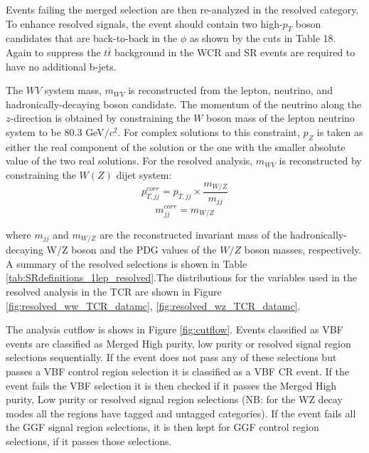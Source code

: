 Events failing the merged selection are then re-analyzed in the resolved category. To enhance resolved signals, the event should contain two high-$p_{T}$ boson candidates that are back-to-back in the $\phi$ as shown by the cuts in Table 18. Again to suppress the $t\bar{t}$ background in the WCR and SR events are required to have no additional b-jets. 

The $WV$ system mass, $m_{WV}$ is reconstructed from the lepton, neutrino, and hadronically-decaying boson candidate. The momentum of the neutrino along the $z$-direction is obtained by constraining the $W$ boson mass of the lepton neutrino system to be  80.3 GeV$/c^{2}$. For complex solutions to this constraint, $p_{Z}$ is taken as either the real component of the solution or the one with the smaller absolute value of the two real solutions. For the resolved analysis, $m_{WV}$ is reconstructed by constraining the $W(Z)$ dijet system:
\begin{equation}
p^{corr}_{T,jj} = p_{T,jj} \times \frac{m_{W/Z}}{m_{jj}}
\end{equation}
\begin{equation}
m^{corr}_{jj}=m_{W/Z}
\end{equation}

where $m_{jj}$ and $m_{W/Z}$ are the reconstructed invariant mass of the hadronically-decaying W/Z boson and the PDG values of the $W/Z$ boson masses, respectively. A summary of the resolved selections is shown in Table \ref{tab:SRdefinitions_1lep_resolved}.The distributions for the variables used in the resolved analysis in the TCR are shown in Figure \ref{fig:resolved_ww_TCR_datamc}, \ref{fig:resolved_wz_TCR_datamc}.
 

The analysis cutflow is shows in Figure \ref{fig:cutflow}. Events classified as VBF events are classified as Merged High purity, low purity or resolved signal region selections sequentially. If the event does not pass any of these selections but passes a VBF control region selection it is classified as a VBF CR event. 
If the event fails the VBF selection it is then checked if it passes the Merged High purity, Low purity or resolved signal region selections (NB: for the WZ decay modes all the regions have tagged and untagged categories). If the event fails all the GGF signal region selections, it is then kept for GGF control region selections, if it passes those selections. 


